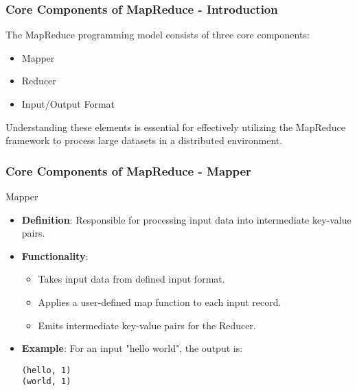 \documentclass[aspectratio=169]{beamer}
\begin{document}
\begin{frame}[fragile]
    \frametitle{Core Components of MapReduce - Introduction}
    The MapReduce programming model consists of three core components:
    \begin{itemize}
        \item Mapper
        \item Reducer
        \item Input/Output Format
    \end{itemize}
    Understanding these elements is essential for effectively utilizing the MapReduce framework to process large datasets in a distributed environment.
\end{frame}

\begin{frame}[fragile]
    \frametitle{Core Components of MapReduce - Mapper}
    \begin{block}{Mapper}
        \begin{itemize}
            \item \textbf{Definition}: Responsible for processing input data into intermediate key-value pairs.
            \item \textbf{Functionality}:
            \begin{itemize}
                \item Takes input data from defined input format.
                \item Applies a user-defined map function to each input record.
                \item Emits intermediate key-value pairs for the Reducer.
            \end{itemize}
            \item \textbf{Example}: For an input "hello world", the output is:
            \begin{verbatim}
(hello, 1)
(world, 1)
            \end{verbatim}
        \end{itemize}
    \end{block}
\end{frame}
\end{document}
